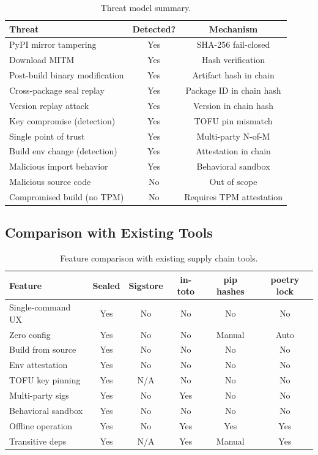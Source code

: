 \documentclass[11pt,a4paper]{article}
\begin{document}
\begin{table}[h]
\centering
\caption{Threat model summary.}
\label{tab:threats}
\begin{tabular}{lcc}
\toprule
\textbf{Threat} & \textbf{Detected?} & \textbf{Mechanism} \\
\midrule
PyPI mirror tampering & Yes & SHA-256 fail-closed \\
Download MITM & Yes & Hash verification \\
Post-build binary modification & Yes & Artifact hash in chain \\
Cross-package seal replay & Yes & Package ID in chain hash \\
Version replay attack & Yes & Version in chain hash \\
Key compromise (detection) & Yes & TOFU pin mismatch \\
Single point of trust & Yes & Multi-party N-of-M \\
Build env change (detection) & Yes & Attestation in chain \\
Malicious import behavior & Yes & Behavioral sandbox \\
Malicious source code & No & Out of scope \\
Compromised build (no TPM) & No & Requires TPM attestation \\
\bottomrule
\end{tabular}
\end{table}

\subsection{Comparison with Existing Tools}

\begin{table}[h]
\centering
\caption{Feature comparison with existing supply chain tools.}
\label{tab:comparison}
\begin{tabular}{lccccc}
\toprule
\textbf{Feature} & \textbf{Sealed} & \textbf{Sigstore} & \textbf{in-toto} & \textbf{pip hashes} & \textbf{poetry lock} \\
\midrule
Single-command UX & Yes & No & No & No & No \\
Zero config & Yes & No & No & Manual & Auto \\
Build from source & Yes & No & No & No & No \\
Env attestation & Yes & No & No & No & No \\
TOFU key pinning & Yes & N/A & No & No & No \\
Multi-party sigs & Yes & No & Yes & No & No \\
Behavioral sandbox & Yes & No & No & No & No \\
Offline operation & Yes & No & Yes & Yes & Yes \\
Transitive deps & Yes & N/A & Yes & Manual & Yes \\
\bottomrule
\end{tabular}
\end{table}
\end{document}
